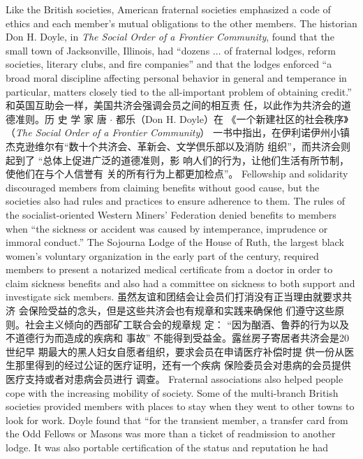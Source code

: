 \begin{paracol}{2}
\switchcolumn*
Like the British societies, American fraternal societies emphasized a code of ethics and each member's mutual obligations
to the other members. The historian Don H. Doyle, in \textit{The Social Order of a Frontier Community}, found that the small town of
Jacksonville, Illinois, had ``dozens $\ldots$ of fraternal lodges, reform societies, literary clubs, and fire companies'' and that the
lodges enforced ``a broad moral discipline affecting personal behavior in general and temperance in particular, matters closely
tied to the all-important problem of obtaining credit.''
\switchcolumn
和英国互助会一样，美国共济会强调会员之间的相互责
任，以此作为共济会的道德准则。历 史 学 家 唐 $\cdot$ 都乐（Don H. Doyle）在 《一个新建社区的社会秩序》（\textit{The Social Order of a Frontier Community}） 一书中指出，在伊利诺伊州小镇杰克逊维尔有“数十个共济会、革新会、文学倶乐部以及消防
组织”，而共济会则起到了 “总体上促进广泛的道德准则，影
响人们的行为，让他们生活有所节制，使他们在与个人信誉有
关的所有行为上都更加检点”。
\switchcolumn*
Fellowship and solidarity discouraged members from claiming benefits without good cause, but the societies also had rules
and practices to ensure adherence to them. The rules of the socialist-oriented Western Miners' Federation denied benefits to
members when ``the sickness or accident was caused by intemperance, imprudence or immoral conduct.'' The Sojourna Lodge
of the House of Ruth, the largest black women's voluntary organization in the early part of the century, required members to
present a notarized medical certificate from a doctor in order to
claim sickness benefits and also had a committee on sickness to
both support and investigate sick members.
\switchcolumn
虽然友谊和团结会让会员们打消没有正当理由就要求共济
会保险受益的念头，但是这些共济会也有规章和实践来确保他
们遵守这些原则。社会主义倾向的西部矿工联合会的规章规
定： “因为酗酒、鲁莽的行为以及不道德行为而造成的疾病和
事故” 不能得到受益金。露丝房子寄居者共济会是20世纪早
期最大的黑人妇女自愿者组织，要求会员在申请医疗补偿时提
供一份从医生那里得到的经过公证的医疗证明，还有一个疾病
保险委员会对患病的会员提供医疗支持或者对患病会员进行
调查。
\switchcolumn*
Fraternal associations also helped people cope with the increasing mobility of society. Some of the multi-branch British societies provided members with places to stay when they went to
other towns to look for work. Doyle found that ``for the transient member, a transfer card from the Odd Fellows or Masons
was more than a ticket of readmission to another lodge. It was
also portable certification of the status and reputation he had

\end{paracol}
